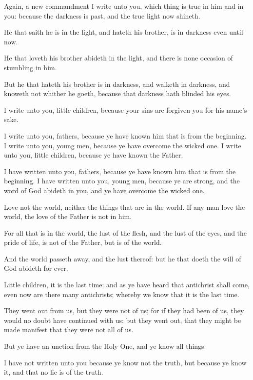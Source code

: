 \Verse Again, a new commandment I write unto you, which thing is true in him and in you: because the darkness is past, and the true light now shineth.

\Verse He that saith he is in the light, and hateth his brother, is in darkness even until now.

\Verse He that loveth his brother abideth in the light, and there is none occasion of stumbling in him.

\Verse But he that hateth his brother is in darkness, and walketh in darkness, and knoweth not whither he goeth, because that darkness hath blinded his eyes.

\Verse I write unto you, little children, because your sins are forgiven you for his name's sake.

\Verse I write unto you, fathers, because ye have known him that is from the beginning. I write unto you, young men, because ye have overcome the wicked one. I write unto you, little children, because ye have known the Father.

\Verse I have written unto you, fathers, because ye have known him that is from the beginning. I have written unto you, young men, because ye are strong, and the word of God abideth in you, and ye have overcome the wicked one.

\Verse Love not the world, neither the things that are in the world. If any man love the world, the love of the Father is not in him.

\Verse For all that is in the world, the lust of the flesh, and the lust of the eyes, and the pride of life, is not of the Father, but is of the world.

\Verse And the world passeth away, and the lust thereof: but he that doeth the will of God abideth for ever.

\Verse Little children, it is the last time: and as ye have heard that antichrist shall come, even now are there many antichrists; whereby we know that it is the last time.

\Verse They went out from us, but they were not of us; for if they had been of us, they would no doubt have continued with us: but they went out, that they might be made manifest that they were not all of us.

\Verse But ye have an unction from the Holy One, and ye know all things.

\Verse I have not written unto you because ye know not the truth, but because ye know it, and that no lie is of the truth.

